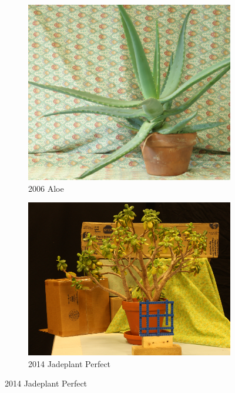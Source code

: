 \begin{figure}
\begin{subfigure}[t]{0.33\linewidth}
    \end{subfigure}\hfill
    \begin{subfigure}[t]{0.33\linewidth}
        \centering
        \includegraphics[width=\linewidth]{Images/Chap_5/2006aloe.png}
        \caption{2006 Aloe}
        \label{fig:2006_aloe}
    \end{subfigure}\hfill
    \begin{subfigure}[t]{0.33\linewidth}
        \centering
        \includegraphics[width=\linewidth]{Images/Chap_5/2014_Jadeplant-perfect.png}
        \caption{2014 Jadeplant Perfect}
        \label{fig:2014_jadeplant}

\end{subfigure}
\end{figure}
